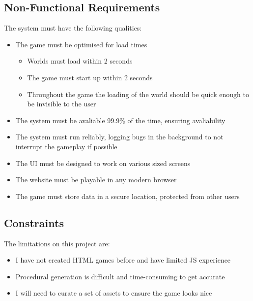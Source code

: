 \documentclass[14pt]{article}
\begin{document}
\subsection{Non-Functional Requirements}
The system must have the following qualities:
\begin{itemize}
  \item The game must be optimised for load times
  \begin{itemize}
    \item Worlds must load within 2 seconds
    \item The game must start up within 2 seconds
    \item Throughout the game the loading of the world should be quick enough to be invisible to the user
  \end{itemize}
  \item The system must be avaliable 99.9\% of the time, ensuring avaliability
  \item The system must run reliably, logging bugs in the background to not interrupt the gameplay if possible
  \item The UI must be designed to work on various sized screens
  \item The website must be playable in any modern browser
  \item The game must store data in a secure location, protected from other users
\end{itemize}

\subsection{Constraints}
The limitations on this project are:
\begin{itemize}
    \item I have not created HTML games before and have limited JS experience
    \item Procedural generation is difficult and time-consuming to get accurate
    \item I will need to curate a set of assets to ensure the game looks nice
\end{itemize}
\end{document}
